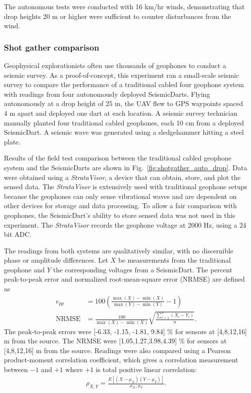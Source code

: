 The autonomous tests were conducted with 16 km/hr winds, demonstrating that drop heights 20 m or higher were sufficient to counter disturbances from the wind.

\subsubsection{Shot gather comparison}
Geophysical explorationists often use thousands of geophones to conduct a seismic survey.
As a proof-of-concept, this experiment ran a small-scale seismic survey to compare the performance of a traditional cabled four geophone system with readings from four autonomously deployed SeismicDarts.
Flying autonomously at a drop height of 25 m, the UAV flew to GPS waypoints spaced 4 m apart and deployed one dart at each location.
A seismic survey technician manually planted four traditional cabled geophones, each 10 cm from a deployed SeismicDart.
A seismic wave was generated using a sledgehammer hitting a steel plate.

Results of the field test comparison between the traditional cabled geophone system and the SeismicDarts are shown in Fig.~\ref{fig:shotgather_auto_drop}.
Data were obtained using a \emph{StrataVisor}, a device that can obtain, store, and plot the sensed data.
The \emph{StrataVisor} is extensively used with traditional geophone setups because the geophones can only sense vibrational waves and are dependent on other devices for storage and data processing.
To allow a fair comparison with geophones, the SeismicDart's  ability to store sensed data was not used in this experiment.
The \emph{StrataVisor} records the geophone voltage at 2000 Hz, using a 24 bit ADC.

The readings from both systems are qualitatively similar, with no discernible phase or amplitude differences.
Let $X$ be measurements from the traditional geophone and $Y$ the corresponding voltages from a SeismicDart.
The percent peak-to-peak error and normalized root-mean-square error (NRMSE) are defined as
\begin{align}
e_{pp} &= 100 \left( \frac{ \max(X) - \min(X) }{ \max(Y) - \min(Y) } -1\right) \\
  \text{NRMSE} &=\frac{100}{\max(X) - \min(X)} \sqrt{ \frac{ \sum_{i=1}^n \left( X_i - Y_i \right)}{n} }.
\end{align}
The peak-to-peak errors were [-6.33, -1.15, -1.81,  9.84] \% for sensors at [4,8,12,16] m from the source.
The NRMSE were [1.05,1.27,3.98,4.39] \% for sensors at [4,8,12,16] m from the source.
Readings were also compared using a Pearson product-moment correlation coefficient, which gives a correlation measurement between $-1$ and $+1$ where $+1$ is total positive linear correlation:
\begin{align}
\rho_{X,Y} = \frac{E\left[  (X-\mu_X) (Y-\mu_Y)  \right]}{  \sigma_X, \sigma_Y}.
\end{align}

